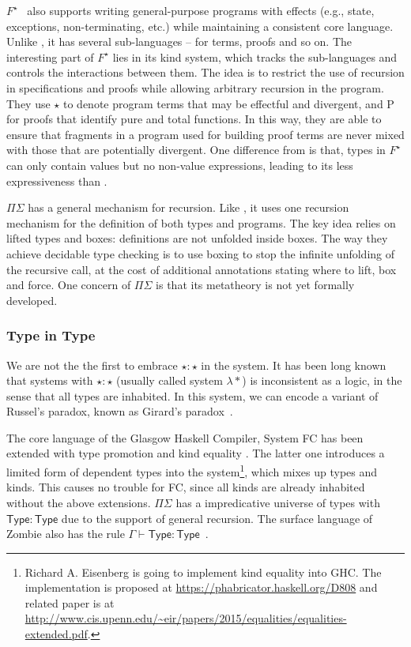 $F^{\star}$~\cite{Swamy2011} also supports writing general-purpose
programs with effects (e.g., state, exceptions, non-terminating, etc.)
while maintaining a consistent core language. Unlike \name, it has
several sub-languages -- for terms, proofs and so on. The interesting
part of $F^{\star}$ lies in its kind system, which tracks the
sub-languages and controls the interactions between them. The idea is
to restrict the use of recursion in specifications and proofs while
allowing arbitrary recursion in the program. They use $\star$ to
denote program terms that may be effectful and divergent, and
\textsf{P} for proofs that identify pure and total functions. In this
way, they are able to ensure that fragments in a program used for
building proof terms are never mixed with those that are potentially
divergent. One difference from \name is that, types in $F^{\star}$ can
only contain values but no non-value expressions, leading to its less
expressiveness than \name.

$\Pi\Sigma$ has a general mechanism for recursion. Like \name, it uses
one recursion mechanism for the definition of both types and
programs. The key idea relies on lifted types and boxes: definitions
are not unfolded inside boxes. The way they achieve decidable type
checking is to use boxing to stop the infinite unfolding of the
recursive call, at the cost of additional annotations stating where to
lift, box and force. One concern of $\Pi\Sigma$ is that its metatheory
is not yet formally developed.

\subsubsection{Type in Type}

We are not the the first to embrace $\star : \star$ in the system. It
has been long known that systems with $\star : \star$ (usually called
system $\lambda *$) is inconsistent as a logic, in the sense that all
types are inhabited. In this system, we can encode a variant of
Russel's paradox, known as Girard's
paradox~\cite{coquand1986analysis}.

The core language of the Glasgow Haskell Compiler, System FC \cite{fc}
has been extended with type promotion \cite{fc:pro} and kind equality
\cite{fc:kind}. The latter one introduces a limited form of dependent
types into the system\footnote{Richard A. Eisenberg is going to
  implement kind equality \cite{fc:kind} into GHC. The implementation
  is proposed at \url{https://phabricator.haskell.org/D808} and
  related paper is at
  \url{http://www.cis.upenn.edu/~eir/papers/2015/equalities/equalities-extended.pdf}.},
which mixes up types and kinds. This causes no trouble for FC, since
all kinds are already inhabited without the above
extensions. $\Pi\Sigma$ has a impredicative universe of types with
$\mathsf{Type} : \mathsf{Type}$ due to the support of general
recursion. The surface language of Zombie also has the rule
$\Gamma \vdash \mathsf{Type} : \mathsf{Type}$~\cite{zombie:popl15}.

